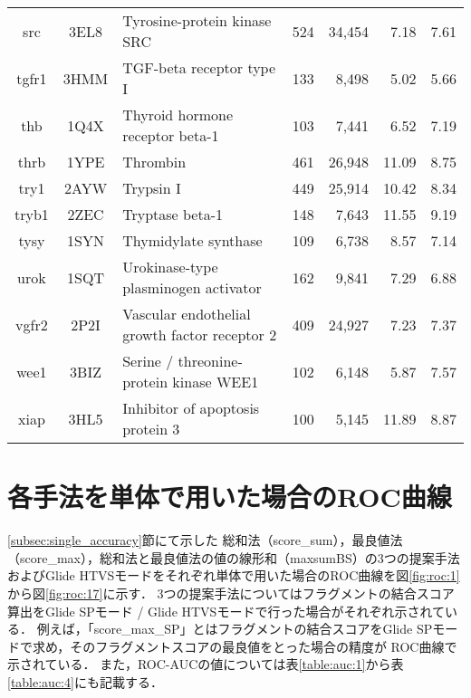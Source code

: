 \begin{table}[t]
\begin{tabular}{c|c|p{6cm}|rr|rr}
src&3EL8&Tyrosine-protein kinase SRC&524&34,454&7.18&7.61 \\
tgfr1&3HMM&TGF-beta receptor type I&133&8,498&5.02&5.66 \\
thb&1Q4X&Thyroid hormone receptor beta-1&103&7,441&6.52&7.19 \\
thrb&1YPE&Thrombin&461&26,948&11.09&8.75 \\
try1&2AYW&Trypsin I&449&25,914&10.42&8.34 \\
tryb1&2ZEC&Tryptase beta-1&148&7,643&11.55&9.19 \\
tysy&1SYN&Thymidylate synthase&109&6,738&8.57&7.14 \\
urok&1SQT&Urokinase-type plasminogen activator&162&9,841&7.29&6.88 \\
vgfr2&2P2I&Vascular endothelial growth factor receptor 2&409&24,927&7.23&7.37 \\
wee1&3BIZ&Serine / threonine-protein kinase WEE1&102&6,148&5.87&7.57 \\
xiap&3HL5&Inhibitor of apoptosis protein 3&100&5,145&11.89&8.87 \\ \hline
	\end{tabular}
\vspace{2cm}
\end{table}

\chapter{各手法を単体で用いた場合のROC曲線}\label{appendix:roc}
\ref{subsec:single_accuracy}節にて示した
総和法（score\_sum），最良値法（score\_max），総和法と最良値法の値の線形和（maxsumBS）の3つの提案手法
およびGlide HTVSモードをそれぞれ単体で用いた場合のROC曲線を図\ref{fig:roc:1}から図\ref{fig:roc:17}に示す．
3つの提案手法についてはフラグメントの結合スコア算出をGlide SPモード / Glide HTVSモードで行った場合がそれぞれ示されている．
例えば，「score\_max\_SP」とはフラグメントの結合スコアをGlide SPモードで求め，そのフラグメントスコアの最良値をとった場合の精度が
ROC曲線で示されている．
また，ROC-AUCの値については表\ref{table:auc:1}から表\ref{table:auc:4}にも記載する．



